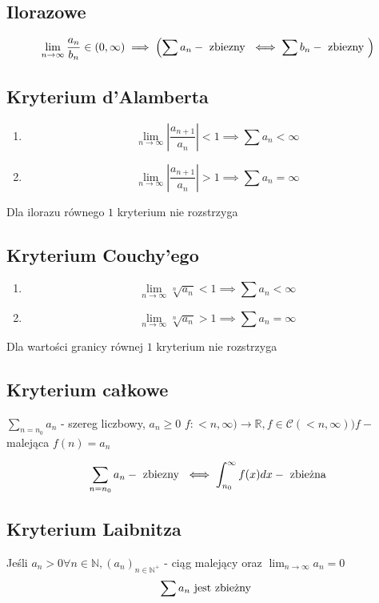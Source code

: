 \documentclass[11pt]{article}
\begin{document}
\subsection{Ilorazowe}
$$ \lim_{n \to \infty}{\frac{a_n}{b_n}} \in (0,\infty) \implies \left( \sum{a_n} - \hbox{ zbiezny } \iff \sum{b_n} - \hbox{ zbiezny } \right) $$

\subsection{Kryterium d'Alamberta}
\begin{enumerate}
\item{
$$ \lim_{n \to \infty}{\left|\frac{a_{n+1}}{a_n}\right| } < 1 \implies \sum{a_n} < \infty $$}
\item{
$$ \lim_{n \to \infty}{\left|\frac{a_{n+1}}{a_n}\right| } > 1 \implies \sum{a_n} = \infty $$} 
\end{enumerate}
Dla ilorazu równego $1$ kryterium nie rozstrzyga

\subsection{Kryterium Couchy'ego}
\begin{enumerate}
\item{
$$ \lim_{n \to \infty}{\sqrt[n]{a_n}} < 1 \implies \sum{a_n} < \infty $$}
\item{
$$ \lim_{n \to \infty}{\sqrt[n]{a_n}} > 1\implies \sum{a_n} = \infty $$} 
\end{enumerate}
Dla wartości granicy równej $1$ kryterium nie rozstrzyga

\subsection{Kryterium całkowe}
$\sum_{n = n_0}{a_n}$ - szereg liczbowy, $ a_n \geq 0 $
$f : <n,\infty) \to \mathbb{R}, f \in \mathcal{C}(<n,\infty)) f - $ malejąca $ f(n) = a_n $

$$ \sum_{n = n_0}{a_n} - \hbox{ zbiezny } \iff \int_{n_0}^{\infty} f(x)dx - \hbox{ zbieżna} $$

\subsection{Kryterium Laibnitza}
Jeśli $a_n >0 \forall n \in \mathbb{N}, (a_n)_{n \in \mathbb{N}^+}$ - ciąg malejący oraz
$\lim_{n \to \infty}{a_n} = 0$ 
$$ \sum{a_n} \hbox{ jest zbieżny }$$
\end{document}
